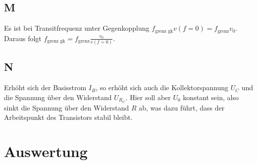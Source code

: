 \documentclass[a4paper,10pt]{article}
\numberwithin{equation}{section}
\begin{document}
\subsection{M}
Es ist bei Transitfrequenz unter Gegenkopplung $f_\text{grenz gk}v\left(f=0\right)=f_\text{grenz}v_0$.
Daraus folgt $f_\text{grenz gk}=f_\text{grenz}\tfrac{v_0}{v\left(f=0\right)}$.

\subsection{N}
Erhöht sich der Basisstrom $I_B$, so erhöht sich auch die Kollektorspannung $U_C$ und die Spannung über den Widerstand $U_{R_C}$.
Hier soll aber $U_0$ konstant sein, also sinkt die Spannung über den Widerstand $R$ ab, was dazu führt, dass der Arbeitspunkt des Transistors stabil bleibt.

\clearpage
\section{Auswertung}

\clearpage
\listoffigures
\listoftables



\end{document}
